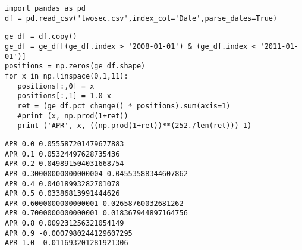 \documentclass[12pt,fleqn]{article}\usepackage{../../common}
\begin{document}
\begin{verbatim}
import pandas as pd
df = pd.read_csv('twosec.csv',index_col='Date',parse_dates=True)
\end{verbatim}

\begin{verbatim}
ge_df = df.copy()
ge_df = ge_df[(ge_df.index > '2008-01-01') & (ge_df.index < '2011-01-01')]
positions = np.zeros(ge_df.shape)
for x in np.linspace(0,1,11):
   positions[:,0] = x
   positions[:,1] = 1.0-x
   ret = (ge_df.pct_change() * positions).sum(axis=1)
   #print (x, np.prod(1+ret))
   print ('APR', x, ((np.prod(1+ret))**(252./len(ret)))-1)
\end{verbatim}

\begin{verbatim}
APR 0.0 0.055587201479677883
APR 0.1 0.05324497628735436
APR 0.2 0.049891504031668754
APR 0.30000000000000004 0.04553588344607862
APR 0.4 0.04018993282701078
APR 0.5 0.03386813991444626
APR 0.6000000000000001 0.02658760032681262
APR 0.7000000000000001 0.018367944897164756
APR 0.8 0.009231256321054149
APR 0.9 -0.0007980244129607295
APR 1.0 -0.011693201281921306
\end{verbatim}
\end{document}
